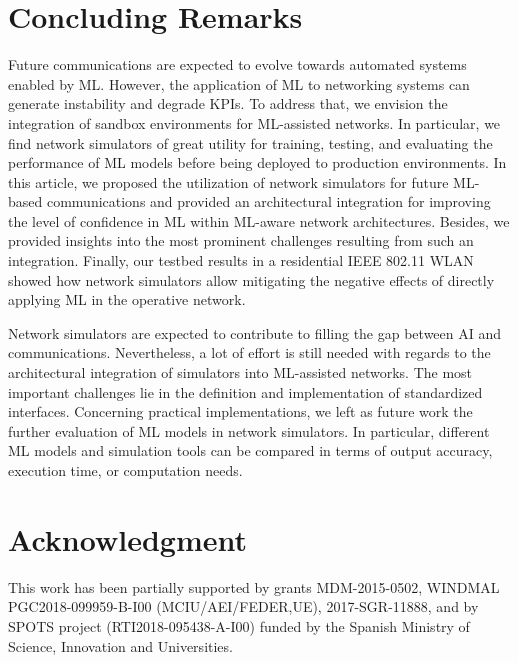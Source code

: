 \documentclass[journal]{IEEEtran}
\begin{document}
	\section{Concluding Remarks}
	Future communications are expected to evolve towards automated systems enabled by ML. However, the application of ML to networking systems can generate instability and degrade KPIs. To address that, we envision the integration of sandbox environments for ML-assisted networks. In particular, we find network simulators of great utility for training, testing, and evaluating the performance of ML models before being deployed to production environments. In this article, we proposed the utilization of network simulators for future ML-based communications and provided an architectural integration for improving the level of confidence in ML within ML-aware network architectures. Besides, we provided insights into the most prominent challenges resulting from such an integration. Finally, our testbed results in a residential IEEE 802.11 WLAN showed how network simulators allow mitigating the negative effects of directly applying ML in the operative network. 
	
	Network simulators are expected to contribute to filling the gap between AI and communications. Nevertheless, a lot of effort is still needed with regards to the architectural integration of simulators into ML-assisted networks. The most important challenges lie in the definition and implementation of standardized interfaces. Concerning practical implementations, we left as future work the further evaluation of ML models in network simulators. In particular, different ML models and simulation tools can be compared in terms of output accuracy, execution time, or computation needs.
	
	\section*{Acknowledgment}
	This work has been partially supported by grants MDM-2015-0502, WINDMAL PGC2018-099959-B-I00 (MCIU/AEI/FEDER,UE), 2017-SGR-11888, and by SPOTS project (RTI2018-095438-A-I00) funded by the Spanish Ministry of Science, Innovation and Universities.
	
	\ifCLASSOPTIONcaptionsoff
	\newpage
	\fi
	
\end{document}
